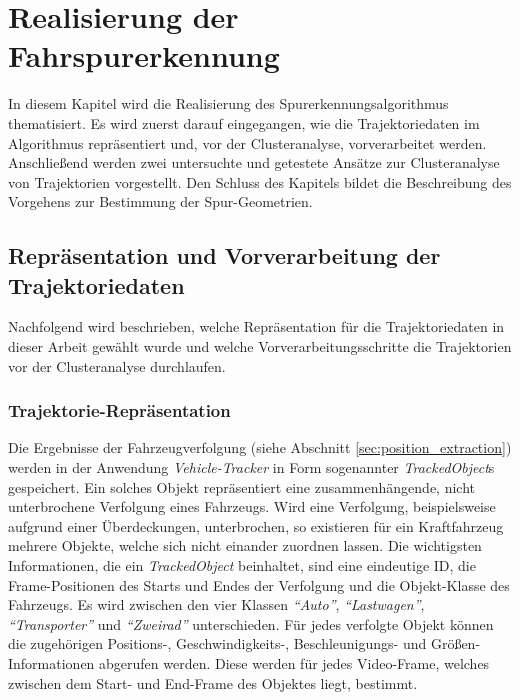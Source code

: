 
\chapter{Realisierung der Fahrspurerkennung}
\label{cha:realisation}

In diesem Kapitel wird die Realisierung des Spurerkennungsalgorithmus thematisiert.
Es wird zuerst darauf eingegangen, wie die Trajektoriedaten im Algorithmus repräsentiert
und, vor der Clusteranalyse, vorverarbeitet werden. Anschließend werden zwei
untersuchte und getestete Ansätze zur Clusteranalyse von Trajektorien vorgestellt.
Den Schluss des Kapitels bildet die Beschreibung des Vorgehens zur Bestimmung der Spur-Geometrien.

\section{Repräsentation und Vorverarbeitung der Trajektoriedaten}
\label{cha:realisation_clustering}

Nachfolgend wird beschrieben, welche Repräsentation für die Trajektoriedaten in dieser Arbeit gewählt
wurde und welche Vorverarbeitungsschritte die Trajektorien vor der Clusteranalyse durchlaufen.

\subsection{Trajektorie-Repräsentation}

Die Ergebnisse der Fahrzeugverfolgung (siehe Abschnitt \ref{sec:position_extraction}) werden
in der Anwendung \textit{Vehicle-Tracker} in Form sogenannter \textit{TrackedObject}s gespeichert.
Ein solches Objekt repräsentiert eine zusammenhängende, nicht unterbrochene Verfolgung eines Fahrzeugs.
Wird eine Verfolgung, beispielsweise aufgrund einer Überdeckungen, unterbrochen, so existieren für ein
Kraftfahrzeug mehrere Objekte, welche sich nicht einander zuordnen lassen.
Die wichtigsten Informationen, die ein \textit{TrackedObject} beinhaltet, sind eine eindeutige ID,
die Frame-Positionen des Starts und Endes der Verfolgung und die Objekt-Klasse des Fahrzeugs. Es wird
zwischen den vier Klassen \textit{``Auto''}, \textit{``Lastwagen''}, \textit{``Transporter''}
und \textit{``Zweirad''} unterschieden.
Für jedes verfolgte Objekt können die zugehörigen Positions-, Geschwindigkeits-, Beschleunigungs-
und Größen-Informationen abgerufen werden. Diese werden für jedes Video-Frame, welches zwischen dem Start-
und End-Frame des Objektes liegt, bestimmt.

